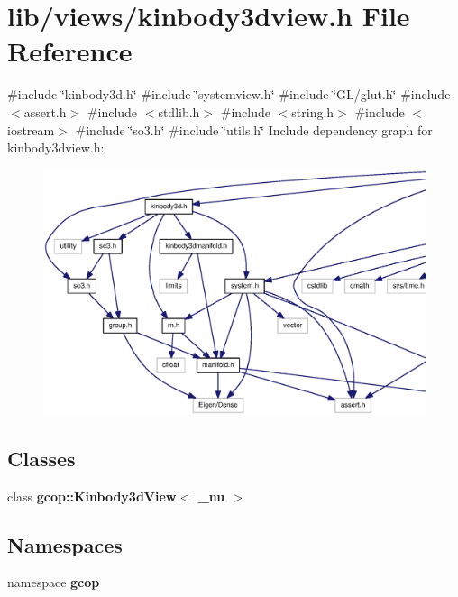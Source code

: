 \section{lib/views/kinbody3dview.h \-File \-Reference}
\label{kinbody3dview_8h}
{\ttfamily \#include \char`\"{}kinbody3d.\-h\char`\"{}}\*
{\ttfamily \#include \char`\"{}systemview.\-h\char`\"{}}\*
{\ttfamily \#include \char`\"{}\-G\-L/glut.\-h\char`\"{}}\*
{\ttfamily \#include $<$assert.\-h$>$}\*
{\ttfamily \#include $<$stdlib.\-h$>$}\*
{\ttfamily \#include $<$string.\-h$>$}\*
{\ttfamily \#include $<$iostream$>$}\*
{\ttfamily \#include \char`\"{}so3.\-h\char`\"{}}\*
{\ttfamily \#include \char`\"{}utils.\-h\char`\"{}}\*
\-Include dependency graph for kinbody3dview.\-h\-:
\nopagebreak
\begin{figure}[H]
\begin{center}
\leavevmode
\includegraphics[width=350pt]{kinbody3dview_8h__incl}
\end{center}
\end{figure}
\subsection*{\-Classes}
\begin{DoxyCompactItemize}
\item 
class {\bf gcop\-::\-Kinbody3d\-View$<$ \-\_\-nu $>$}
\end{DoxyCompactItemize}
\subsection*{\-Namespaces}
\begin{DoxyCompactItemize}
\item 
namespace {\bf gcop}
\end{DoxyCompactItemize}
